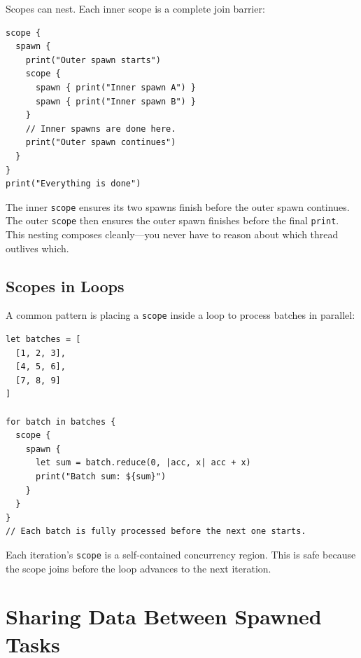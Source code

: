 
Scopes can nest. Each inner scope is a complete join barrier:

\begin{lstlisting}[language=Lattice, caption={Nested scopes}]
scope {
  spawn {
    print("Outer spawn starts")
    scope {
      spawn { print("Inner spawn A") }
      spawn { print("Inner spawn B") }
    }
    // Inner spawns are done here.
    print("Outer spawn continues")
  }
}
print("Everything is done")
\end{lstlisting}

The inner \lstinline|scope| ensures its two spawns finish before the outer spawn continues.
The outer \lstinline|scope| then ensures the outer spawn finishes before the final \lstinline|print|.
This nesting composes cleanly---you never have to reason about which thread outlives which.

\subsection{Scopes in Loops}


A common pattern is placing a \lstinline|scope| inside a loop to process batches in parallel:

\begin{lstlisting}[language=Lattice, caption={Scope inside a loop}]
let batches = [
  [1, 2, 3],
  [4, 5, 6],
  [7, 8, 9]
]

for batch in batches {
  scope {
    spawn {
      let sum = batch.reduce(0, |acc, x| acc + x)
      print("Batch sum: ${sum}")
    }
  }
}
// Each batch is fully processed before the next one starts.
\end{lstlisting}

Each iteration's \lstinline|scope| is a self-contained concurrency region.
This is safe because the scope joins before the loop advances to the next iteration.

\section{Sharing Data Between Spawned Tasks}\label{sec:sharing-data-spawns}


